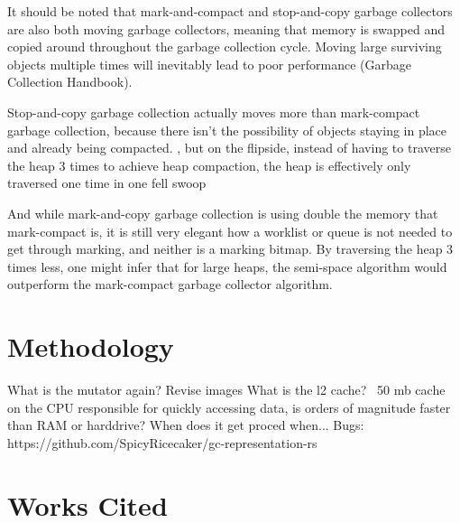 \documentclass[index]{subfiles}
\begin{document}
It should be noted that mark-and-compact and stop-and-copy garbage collectors are also both moving garbage collectors, meaning that memory is swapped and copied around throughout the garbage collection cycle. Moving large  surviving objects multiple times will inevitably lead to poor performance (Garbage Collection Handbook).

Stop-and-copy garbage collection actually moves more than mark-compact garbage collection, because there isn't the possibility of objects staying in place and already being compacted. , but on the flipside, instead of having to traverse the heap 3 times to achieve heap compaction, the heap is effectively only traversed one time in one fell swoop

And while mark-and-copy garbage collection is using double the memory that mark-compact is, it is still very elegant how a worklist or queue is not needed to  get through marking, and neither is a marking bitmap. By traversing the heap 3 times less, one might infer that for large heaps, the semi-space algorithm would outperform the mark-compact garbage collector algorithm.

\section{Methodology}


What is the mutator again?
Revise images
What is the l2 cache?
~50 mb cache on the CPU responsible for quickly accessing data, is orders of magnitude faster than RAM or harddrive?
When does it get proced when...
Bugs: https://github.com/SpicyRicecaker/gc-representation-rs

\section{Works Cited}

\printbibliography
\end{document}
